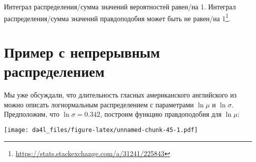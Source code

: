 \documentclass[
]{book}
\newenvironment{Shaded}{\begin{snugshade}}{\end{snugshade}}
\newcommand{\AttributeTok}[1]{\textcolor[rgb]{0.77,0.63,0.00}{#1}}
\newcommand{\ControlFlowTok}[1]{\textcolor[rgb]{0.13,0.29,0.53}{\textbf{#1}}}
\newcommand{\DecValTok}[1]{\textcolor[rgb]{0.00,0.00,0.81}{#1}}
\newcommand{\FloatTok}[1]{\textcolor[rgb]{0.00,0.00,0.81}{#1}}
\newcommand{\FunctionTok}[1]{\textcolor[rgb]{0.00,0.00,0.00}{#1}}
\newcommand{\NormalTok}[1]{#1}
\newcommand{\OtherTok}[1]{\textcolor[rgb]{0.56,0.35,0.01}{#1}}
\newcommand{\SpecialCharTok}[1]{\textcolor[rgb]{0.00,0.00,0.00}{#1}}
\newcommand{\StringTok}[1]{\textcolor[rgb]{0.31,0.60,0.02}{#1}}
\renewcommand{\href}[2]{#2\footnote{\url{#1}}}
\begin{document}
Интеграл распределения/сумма значений вероятностей равен/на 1. \href{https://stats.stackexchange.com/a/31241/225843}{Интеграл распределения/сумма значений правдоподобия может быть не равен/на 1}.

\hypertarget{ux43fux440ux438ux43cux435ux440-ux441-ux43dux435ux43fux440ux435ux440ux44bux432ux43dux44bux43c-ux440ux430ux441ux43fux440ux435ux434ux435ux43bux435ux43dux438ux435ux43c}{%
\section{Пример с непрерывным распределением}\label{ux43fux440ux438ux43cux435ux440-ux441-ux43dux435ux43fux440ux435ux440ux44bux432ux43dux44bux43c-ux440ux430ux441ux43fux440ux435ux434ux435ux43bux435ux43dux438ux435ux43c}}

Мы уже обсуждали, что длительность гласных американского английского из \citep{hillenbrand95} можно описать логнормальным распределением с параметрами \(\ln\mu\) и \(\ln\sigma\). Предположим, что \(\ln\sigma = 0.342\), построим функцию правдоподобия для \(\ln\mu\):

\begin{Shaded}
\end{Shaded}

\texttt{[image: da4l\_files/figure-latex/unnamed-chunk-45-1.pdf]}
\end{document}
